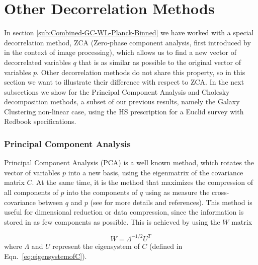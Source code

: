 \section{Other Decorrelation Methods}\label{sec:appdec}

In section \ref{sub:Combined-GC-WL-Planck-Binned} we have worked with a special decorrelation method, ZCA (Zero-phase component analysis, first 
introduced by \cite{Bell19973327} in the context of image processing), which
allows us to find a new vector of decorrelated variables $q$ that is as similar as possible to the original
vector of variables $p$.
Other decorrelation methods do not share this property,
so in this section we want to illustrate their difference 
with respect to ZCA.
In the next subsections we show for the Principal Component Analysis and Cholesky decomposition methods, 
a subset of our previous results, namely the Galaxy Clustering non-linear case, 
using the HS prescription for a Euclid survey with Redbook specifications.

\subsubsection{Principal Component Analysis }

Principal Component Analysis (PCA) \cite{Friedman-PCA} is a well known method, which rotates
the vector of variables $p$ into a new basis, using the eigenmatrix of the 
covariance matrix $C$. At the same time, it is the method that maximizes the compression of all components
of $p$ into the components of $q$ using as measure the cross-covariance
between $q$ and $p$ (see \cite{kessy_optimal_2015} for more details and references).
This method is useful for dimensional reduction or data compression, 
since the information is stored in as few components as possible.
This is achieved by using the $W$ matrix

\begin{equation}
W=\Lambda^{-1/2}U^{T}
\end{equation}
where $\Lambda$ and $U$ represent the eigensystem of $C$ (defined in Eqn.\ \ref{eq:eigensystemofC}).

